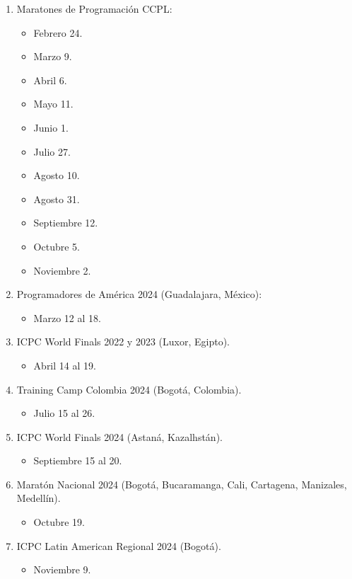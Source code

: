\documentclass[12pt]{article}
\begin{document}
\begin{enumerate}
\item Maratones de Programación CCPL:
  \begin{itemize}
  \item Febrero 24.
  \item Marzo 9.
  \item Abril 6.
  \item Mayo 11.
  \item Junio 1.
  \item Julio 27.
  \item Agosto 10.
  \item Agosto 31.
  \item Septiembre 12.
  \item Octubre 5.
  \item Noviembre 2.
  \end{itemize}
\item Programadores de América 2024 (Guadalajara, México):
  \begin{itemize}
  \item Marzo 12 al 18.
  \end{itemize}
\item ICPC World Finals 2022 y 2023 (Luxor, Egipto).
  \begin{itemize}
  \item Abril 14 al 19.
  \end{itemize}
\item Training Camp Colombia 2024 (Bogotá, Colombia).
  \begin{itemize}
  \item Julio 15 al 26.
  \end{itemize}
\item ICPC World Finals 2024 (Astaná, Kazalhstán).
  \begin{itemize}
  \item Septiembre 15 al 20.
  \end{itemize}
\item Maratón Nacional 2024 (Bogotá, Bucaramanga, Cali, Cartagena, Manizales, Medellín).
  \begin{itemize}
  \item Octubre 19.
  \end{itemize}
\item ICPC Latin American Regional 2024 (Bogotá).
  \begin{itemize}
  \item Noviembre 9.
  \end{itemize}
\end{enumerate}
\end{document}
